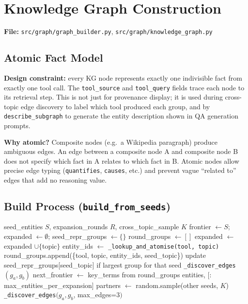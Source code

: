 \documentclass[11pt,a4paper]{article}
\begin{document}
\section{Knowledge Graph Construction}
\label{sec:kg}

\textbf{File:} \texttt{src/graph/graph\_builder.py}, \texttt{src/graph/knowledge\_graph.py}

\subsection{Atomic Fact Model}

\textbf{Design constraint:} every KG node represents exactly one indivisible fact from exactly one tool call. The \texttt{tool\_source} and \texttt{tool\_query} fields trace each node to its retrieval step. This is not just for provenance display; it is used during cross-topic edge discovery to label which tool produced each group, and by \texttt{describe\_subgraph} to generate the entity description shown in QA generation prompts.

\textbf{Why atomic?} Composite nodes (e.g.\ a Wikipedia paragraph) produce ambiguous edges. An edge between a composite node A and composite node B does not specify which fact in A relates to which fact in B. Atomic nodes allow precise edge typing (\texttt{quantifies}, \texttt{causes}, etc.) and prevent vague ``related to'' edges that add no reasoning value.

\subsection{Build Process (\texttt{build\_from\_seeds})}

\begin{algorithm}
\caption{\texttt{GraphBuilder.build\_from\_seeds}}
\begin{algorithmic}[1]
\Require seed\_entities $S$, expansion\_rounds $R$, cross\_topic\_sample $K$
\State frontier $\leftarrow S$; expanded $\leftarrow \emptyset$; seed\_repr\_groups $\leftarrow \{\}$
  \State round\_groups $\leftarrow []$
    \State expanded $\leftarrow$ expanded $\cup \{$topic$\}$
      \State entity\_ids $\leftarrow$ \texttt{\_lookup\_and\_atomise(tool, topic)}
      \State round\_groups.append(\{tool, topic, entity\_ids, seed\_topic\})
      \State update seed\_repr\_groups[seed\_topic] if largest group for that seed
    \EndFor
  \EndFor
    \State \texttt{\_discover\_edges}$(g_a, g_b)$
  \EndFor
  \State next\_frontier $\leftarrow$ key\_terms from round\_groups entities, $[:$max\_entities\_per\_expansion$]$
\EndFor
{}
    \State partners $\leftarrow$ random.sample(other seeds, $K$)
      \State \texttt{\_discover\_edges}$(g_a, g_b$, max\_edges=3$)$
    \EndFor
  \EndFor
\EndIf
\end{algorithmic}
\end{algorithm}
\end{document}
